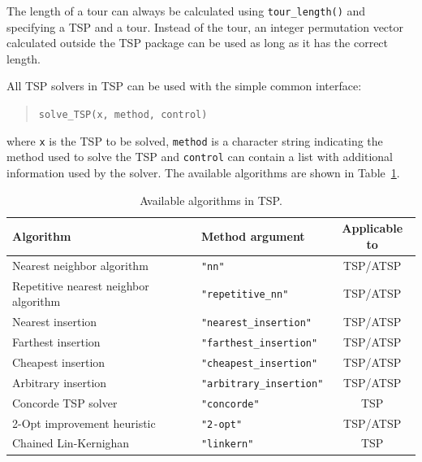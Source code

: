 \documentclass[10pt,a4paper,fleqn]{article}
\newcommand{\strong}[1]{{\normalfont\fontseries{b}\selectfont #1}}
\newcommand{\func}[1]{\mbox{\texttt{#1()}}}
\newcommand{\code}[1]{\mbox{\texttt{#1}}}
\newcommand{\pkg}[1]{\strong{#1}}
\begin{document}
The length of a tour can always be calculated using \func{tour\_length}
and specifying a TSP and a tour. Instead of the tour, an integer
permutation vector calculated outside the \pkg{TSP} package can be used
as long as it has the correct length.

All TSP solvers in \pkg{TSP} can be used with the simple common interface:

\begin{quote}
\code{solve\_TSP(x, method, control)}   
\end{quote}
where \code{x} is the TSP to be solved, \code{method} is a character
string indicating the method used to solve the TSP and \code{control}
can contain a list with additional information used by the solver.
The available algorithms are shown in Table~\ref{tab:methods}.    

\begin{table}
    \caption{Available algorithms in \pkg{TSP}.}\label{tab:methods}
    \centering
    \begin{tabular}{llc}
    \hline
    \textbf{Algorithm} & \textbf{Method argument} & \textbf{Applicable to} \\
    \hline
    Nearest neighbor algorithm & \code{"nn"} & TSP/ATSP \\
    Repetitive nearest neighbor algorithm & \code{"repetitive\_nn"} 
            & TSP/ATSP \\
    Nearest insertion & \code{"nearest\_insertion"} & TSP/ATSP  \\
    Farthest insertion & \code{"farthest\_insertion"} & TSP/ATSP  \\
    Cheapest insertion & \code{"cheapest\_insertion"} & TSP/ATSP  \\
    Arbitrary insertion & \code{"arbitrary\_insertion"} & TSP/ATSP  \\
    Concorde TSP solver & \code{"concorde"} & TSP  \\
    2-Opt improvement heuristic &  \code{"2-opt"}  & TSP/ATSP \\
    Chained Lin-Kernighan &  \code{"linkern"}  & TSP \\
\hline
\end{tabular}
\end{table}
\end{document}
